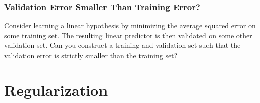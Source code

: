 \documentclass[12pt]{report}
\begin{document}
\subsection{Validation Error Smaller Than Training Error?} 
Consider learning a linear hypothesis by minimizing the average 
squared error on some training set. The resulting linear predictor 
is then validated on some other validation set. Can you construct 
a training and validation set such that the validation error is strictly 
smaller than the training set?



\newpage 
\chapter{Regularization}
\label{ch_overfitting_regularization}
\vspace*{-10mm}
\end{document}
